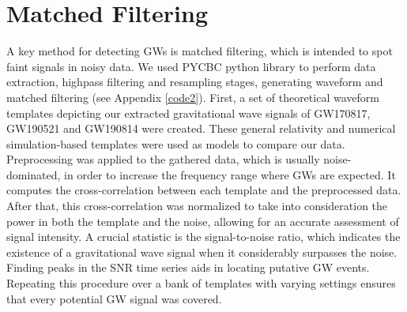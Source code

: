 \section{Matched Filtering}
A key method for detecting GWs is matched filtering, which is intended to spot faint signals in noisy data. We used PYCBC python library to perform data extraction, highpass filtering and resampling stages, generating waveform and matched filtering (see Appendix \ref{code2}). First, a set of theoretical waveform templates depicting our extracted gravitational wave signals of GW170817, GW190521 and GW190814  were created. These general relativity and numerical simulation-based templates were used as models to compare our data. Preprocessing was applied to the gathered data, which is usually noise-dominated, in order to increase the frequency range where GWs are expected. It computes the cross-correlation between each template and the preprocessed data. After that, this cross-correlation was normalized to take into consideration the power in both the template and the noise, allowing for an accurate assessment of signal intensity. A crucial statistic is the signal-to-noise ratio, which indicates the existence of a gravitational wave signal when it considerably surpasses the noise. Finding peaks in the SNR time series aids in locating putative GW events. Repeating this procedure over a bank of templates with varying settings ensures that every potential GW signal was covered.


